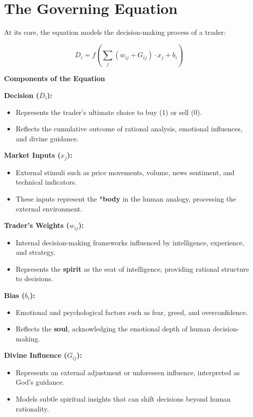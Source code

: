 \documentclass[a4]{article}
\newcommand{\bn}{\bigskip\noindent}
\begin{document}
\bn
\section{The Governing Equation}

At its core, the equation models the decision-making process of a trader:

$$
D_i = f\left(\sum_{j} (w_{ij} + G_{ij}) \cdot x_j + b_i\right)
$$

\bn
{\bf Components of the Equation}

\bn
{\bf Decision ($D_i$):}

\begin{itemize}
\item  Represents the trader's ultimate choice to buy (1) or sell (0).
\item Reflects the cumulative outcome of rational analysis, emotional influences, and divine guidance.
\end{itemize}

\bn
{\bf Market Inputs ($x_j$):}

\begin{itemize}
\item  External stimuli such as price movements, volume, news sentiment, and technical indicators.
\item These inputs represent the *{\bf body} in the human analogy, processing the external environment.
\end{itemize}

\bn
{\bf Trader's Weights ($w_{ij}$):}

\begin{itemize}
\item  Internal decision-making frameworks influenced by intelligence, experience, and strategy.
\item Represents the {\bf spirit} as the seat of intelligence, providing rational structure to decisions.
\end{itemize}

\bn
{\bf Bias ($b_i$):}

\begin{itemize}
\item  Emotional and psychological factors such as fear, greed, and overconfidence.
\item Reflects the {\bf soul}, acknowledging the emotional depth of human decision-making.
\end{itemize}


\bn
{\bf Divine Influence ($G_{ij}$):}

\begin{itemize}
\item  Represents an external adjustment or unforeseen influence, interpreted as God's guidance.
\item Models subtle spiritual insights that can shift decisions beyond human rationality.
\end{itemize}
\end{document}
